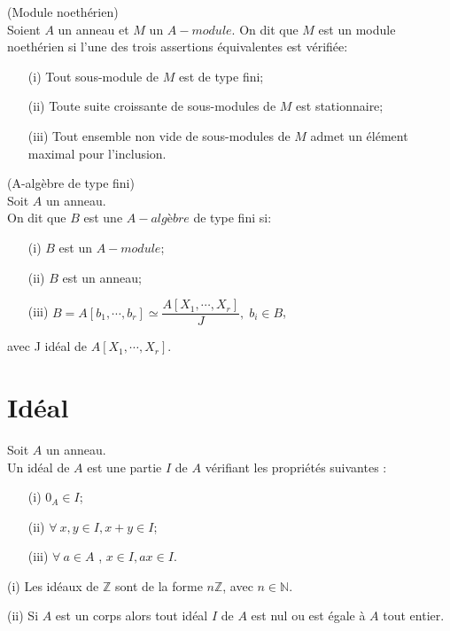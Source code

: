 \begin{madefinition_proposition}(Module noethérien) \\
	Soient $A$ un anneau et $M$ un $A-module$. On dit que $M$ est un module noethérien si l'une des trois assertions équivalentes est vérifiée:
	\begin{enumerate}
		\item[(i)] Tout sous-module de $M$ est de type fini;
		\item[(ii)] Toute suite croissante de sous-modules de $M$ est stationnaire;
		\item[(iii)] Tout ensemble non vide de sous-modules de $M$ admet un élément maximal pour l'inclusion.
	\end{enumerate} 
\end{madefinition_proposition}
\begin{madefinition}(A-algèbre de type fini)\\
	Soit $A$ un anneau. \\
	On dit que $B$ est une $A-algèbre$ de type fini si:
	\begin{enumerate}
		\item[(i)] $B$ est un $A-module$;
		\item[(ii)] $B$ est un anneau;
		\item[(iii)] $B = A [b_1, \cdots, b_r] \simeq \dfrac{A[X_1, \cdots, X_r]}{J}, \; b_i \in B$,
	\end{enumerate}
	avec J idéal de $A[X_1, \cdots, X_r]$.
\end{madefinition}
\section{Idéal}
\begin{madefinition}
	Soit $A$ un anneau.\\
	Un idéal de $A$ est une partie $I$ de $A$ vérifiant les propriétés suivantes :
	\begin{enumerate}
		\item[(i)] $0_A \in I$;
		\item[(ii)] $ \forall \ x, y \in I, x+y \in I$;
		\item[(iii)] $ \forall \ a \in A$ , $x \in I , ax \in I$.
	\end{enumerate}
\end{madefinition}
\begin{monexemple}
	\item[(i)] Les idéaux de $\mathbb{Z}$ sont de la forme $n\mathbb{Z}$, avec $n \in \mathbb{N}$.
	\item[(ii)] Si $A$ est un corps alors tout idéal $I$ de $A$ est nul ou est égale à $A$ tout entier.
\end{monexemple}
